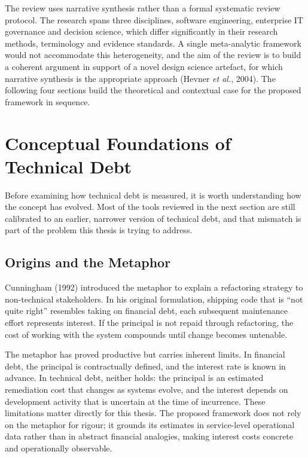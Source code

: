 \documentclass[
  12pt,
  letterpaper,
  12pt,
  oneside,
  english,
  onehalfspacing,
  headsepline]{MastersDoctoralThesis}
\begin{document}
The review uses narrative synthesis rather than a formal systematic
review protocol. The research spans three disciplines, software
engineering, enterprise IT governance and decision science, which differ
significantly in their research methods, terminology and evidence
standards. A single meta-analytic framework would not accommodate this
heterogeneity, and the aim of the review is to build a coherent argument
in support of a novel design science artefact, for which narrative
synthesis is the appropriate approach (Hevner \emph{et al.}, 2004). The
following four sections build the theoretical and contextual case for
the proposed framework in sequence.

\section{Conceptual Foundations of Technical
Debt}\label{conceptual-foundations-of-technical-debt}

Before examining how technical debt is measured, it is worth
understanding how the concept has evolved. Most of the tools reviewed in
the next section are still calibrated to an earlier, narrower version of
technical debt, and that mismatch is part of the problem this thesis is
trying to address.

\subsection{Origins and the Metaphor}\label{origins-and-the-metaphor}

Cunningham (1992) introduced the metaphor to explain a refactoring
strategy to non-technical stakeholders. In his original formulation,
shipping code that is ``not quite right'' resembles taking on financial
debt, each subsequent maintenance effort represents interest. If the
principal is not repaid through refactoring, the cost of working with
the system compounds until change becomes untenable.

The metaphor has proved productive but carries inherent limits. In
financial debt, the principal is contractually defined, and the interest
rate is known in advance. In technical debt, neither holds: the
principal is an estimated remediation cost that changes as systems
evolve, and the interest depends on development activity that is
uncertain at the time of incurrence. These limitations matter directly
for this thesis. The proposed framework does not rely on the metaphor
for rigour; it grounds its estimates in service-level operational data
rather than in abstract financial analogies, making interest costs
concrete and operationally observable.
\end{document}
